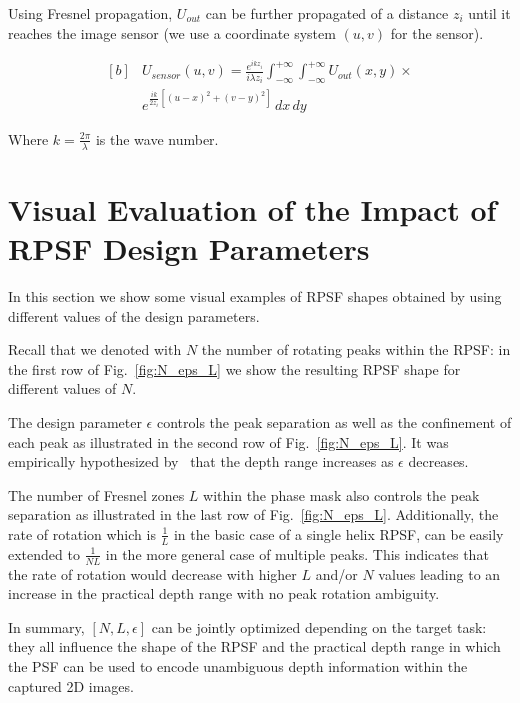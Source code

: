 \documentclass[preprint,5p,twocolumn]{elsarticle}
\begin{document}
Using Fresnel propagation, $U_{out}$ can be further propagated of a distance $z_{i}$ until it reaches the image sensor (we use a coordinate system $(u,v)$ for the sensor). 

\begin{equation}
\begin{aligned}[b]
    & U_{sensor}(u,v)= \frac{e^{ikz_{i}}}{i\lambda z_{i}}\int_{-\infty}^{+\infty} \int_{-\infty}^{+\infty}U_{out}(x,y)\times {}\\
    & e^{\frac{ik}{2z_{i}}[(u-x)^2+(v-y)^2]}\,dx \,dy
    \end{aligned}
\end{equation}

Where $k=\frac{2\pi}{\lambda}$ is the wave number.




\section{Visual Evaluation of the Impact of RPSF Design Parameters}
\label{sec:rpsf}


In this section we show some visual examples of  RPSF shapes obtained by using different values of the design parameters.

Recall that we denoted with $N$  the number of rotating peaks within the RPSF:
in the first row of Fig.~\ref{fig:N_eps_L} we show the resulting RPSF shape for different values of $N$.

The design parameter $\epsilon$ controls the peak separation as well as the confinement of each peak as illustrated in the second row of Fig.~\ref{fig:N_eps_L}. It was empirically hypothesized by~\cite{berlich2018high} that the depth range increases as $\epsilon$ decreases.

The number of Fresnel zones $L$ within the phase mask also controls the peak separation as illustrated in the last row of Fig.~\ref{fig:N_eps_L}.
Additionally, the rate of rotation which is $\frac{1}{L}$ in the basic case of a single helix RPSF, can be easily extended to $\frac{1}{NL}$ in the more general case of multiple peaks.
This indicates that the rate of rotation would decrease with higher $L$ and/or $N$ values leading to an increase in the practical depth range with no peak rotation ambiguity. 

In summary, $[N,L,\epsilon]$ can be jointly optimized depending on the target task: they all influence the shape of the RPSF and the practical depth range in which the PSF can be used to encode unambiguous depth information within the captured 2D images.
\end{document}
